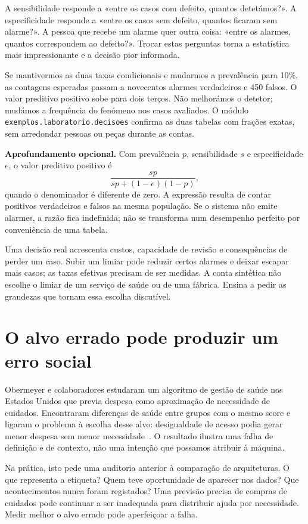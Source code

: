 A sensibilidade responde a «entre os casos com defeito, quantos detetámos?». A especificidade responde a «entre os casos sem defeito, quantos ficaram sem alarme?». A pessoa que recebe um alarme quer outra coisa: «entre os alarmes, quantos correspondem ao defeito?». Trocar estas perguntas torna a estatística mais impressionante e a decisão pior informada.

Se mantivermos as duas taxas condicionais e mudarmos a prevalência para 10\%, as contagens esperadas passam a novecentos alarmes verdadeiros e 450 falsos. O valor preditivo positivo sobe para dois terços. Não melhorámos o detetor; mudámos a frequência do fenómeno nos casos avaliados. O módulo \texttt{exemplos.laboratorio.decisoes} confirma as duas tabelas com frações exatas, sem arredondar pessoas ou peças durante as contas.

\textbf{Aprofundamento opcional.} Com prevalência $p$, sensibilidade $s$ e especificidade $e$, o valor preditivo positivo é
\[
\frac{sp}{sp+(1-e)(1-p)},
\]
quando o denominador é diferente de zero. A expressão resulta de contar positivos verdadeiros e falsos na mesma população. Se o sistema não emite alarmes, a razão fica indefinida; não se transforma num desempenho perfeito por conveniência de uma tabela.

Uma decisão real acrescenta custos, capacidade de revisão e consequências de perder um caso. Subir um limiar pode reduzir certos alarmes e deixar escapar mais casos; as taxas efetivas precisam de ser medidas. A conta sintética não escolhe o limiar de um serviço de saúde ou de uma fábrica. Ensina a pedir as grandezas que tornam essa escolha discutível.

\section{O alvo errado pode produzir um erro social}
Obermeyer e colaboradores estudaram um algoritmo de gestão de saúde nos Estados Unidos que previa despesa como aproximação de necessidade de cuidados. Encontraram diferenças de saúde entre grupos com o mesmo score e ligaram o problema à escolha desse alvo: desigualdade de acesso podia gerar menor despesa sem menor necessidade~\citep{obermeyer2019}. O resultado ilustra uma falha de definição e de contexto, não uma intenção que possamos atribuir à máquina.

Na prática, isto pede uma auditoria anterior à comparação de arquiteturas. O que representa a etiqueta? Quem teve oportunidade de aparecer nos dados? Que acontecimentos nunca foram registados? Uma previsão precisa de compras de cuidados pode continuar a ser inadequada para distribuir ajuda por necessidade. Medir melhor o alvo errado pode aperfeiçoar a falha.

